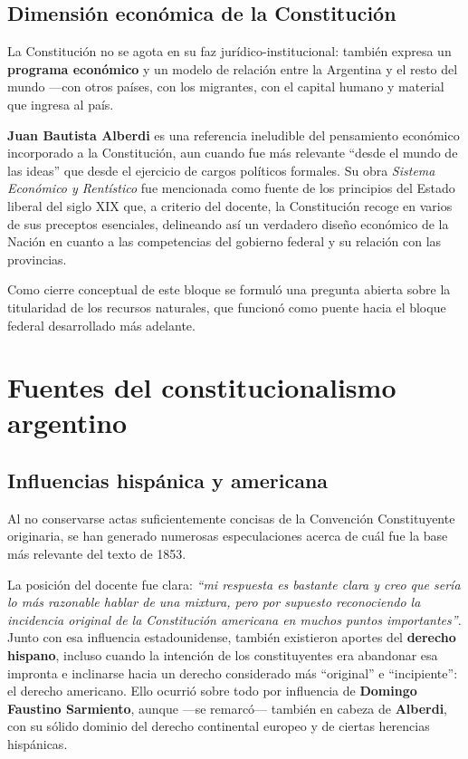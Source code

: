 \documentclass[12pt,oneside]{book}
\begin{document}
\section{Dimensión económica de la Constitución}

La Constitución no se agota en su faz jurídico-institucional: también expresa un \textbf{programa económico} y un modelo de relación entre la Argentina y el resto del mundo ---con otros países, con los migrantes, con el capital humano y material que ingresa al país.

\textbf{Juan Bautista Alberdi} es una referencia ineludible del pensamiento económico incorporado a la Constitución, aun cuando fue más relevante ``desde el mundo de las ideas'' que desde el ejercicio de cargos políticos formales. Su obra \textit{Sistema Económico y Rentístico} fue mencionada como fuente de los principios del Estado liberal del siglo XIX que, a criterio del docente, la Constitución recoge en varios de sus preceptos esenciales, delineando así un verdadero diseño económico de la Nación en cuanto a las competencias del gobierno federal y su relación con las provincias.

Como cierre conceptual de este bloque se formuló una pregunta abierta sobre la titularidad de los recursos naturales, que funcionó como puente hacia el bloque federal desarrollado más adelante.

\chapter[Fuentes del constitucionalismo argentino]{Fuentes del constitucionalismo argentino}

\section{Influencias hispánica y americana}

Al no conservarse actas suficientemente concisas de la Convención Constituyente originaria, se han generado numerosas especulaciones acerca de cuál fue la base más relevante del texto de 1853.

La posición del docente fue clara: \textit{``mi respuesta es bastante clara y creo que sería lo más razonable hablar de una mixtura, pero por supuesto reconociendo la incidencia original de la Constitución americana en muchos puntos importantes''}. Junto con esa influencia estadounidense, también existieron aportes del \textbf{derecho hispano}, incluso cuando la intención de los constituyentes era abandonar esa impronta e inclinarse hacia un derecho considerado más ``original'' e ``incipiente'': el derecho americano. Ello ocurrió sobre todo por influencia de \textbf{Domingo Faustino Sarmiento}, aunque ---se remarcó--- también en cabeza de \textbf{Alberdi}, con su sólido dominio del derecho continental europeo y de ciertas herencias hispánicas.
\end{document}
